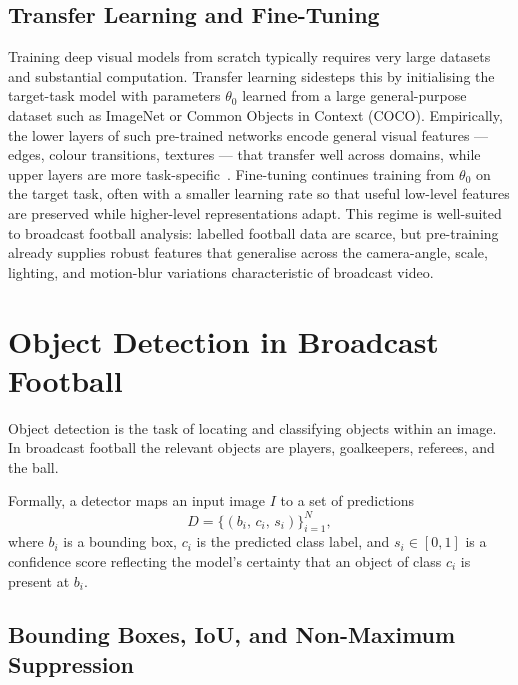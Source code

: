 \subsection{Transfer Learning and Fine-Tuning}
\label{sec:transfer-learning}

Training deep visual models from scratch typically requires 
very large datasets and substantial computation. Transfer 
learning sidesteps this by initialising the target-task 
model with parameters \(\theta_0\) learned from a large 
general-purpose dataset such as ImageNet or Common Objects in Context (COCO).
Empirically, the lower layers of such pre-trained networks 
encode general visual features — edges, colour transitions, 
textures — that transfer well across domains, while upper 
layers are more task-specific~\cite{Yosinski2014}. 
Fine-tuning continues training from \(\theta_0\) on the 
target task, often with a smaller learning rate so that 
useful low-level features are preserved while higher-level 
representations adapt. This regime is well-suited to 
broadcast football analysis: labelled football data are 
scarce, but pre-training already supplies robust features 
that generalise across the camera-angle, scale, lighting, 
and motion-blur variations characteristic of broadcast 
video.

\section{Object Detection in Broadcast Football}
\label{sec:background_object_detection}

Object detection is the task of locating and classifying 
objects within an image. In broadcast football the relevant 
objects are players, goalkeepers, referees, and the ball.

Formally, a detector maps an input image \(I\) to a set of 
predictions
\begin{equation}
    D = \{(b_i,\, c_i,\, s_i)\}_{i=1}^{N},
    \label{eq:detection_output}
\end{equation}
where \(b_i\) is a bounding box, \(c_i\) is the predicted 
class label, and \(s_i \in [0,1]\) is a confidence score 
reflecting the model's certainty that an object of class 
\(c_i\) is present at \(b_i\).

\subsection{Bounding Boxes, IoU, and Non-Maximum Suppression}
\label{subsec:background_iou_nms}

